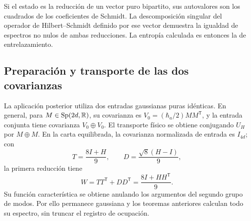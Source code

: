 Si el estado es la reducción de un vector puro bipartito, sus
autovalores son los cuadrados de los coeficientes de Schmidt.
La descomposición singular del operador de Hilbert--Schmidt definido
por ese vector demuestra la igualdad de espectros no nulos de ambas
reducciones. La entropía calculada es entonces la de entrelazamiento.

\subsection{Preparación y transporte de las dos covarianzas}
La aplicación posterior utiliza dos entradas gaussianas puras idénticas.
En general, para \(M\in\operatorname{Sp}(2d,\mathbb R)\), su covarianza es
\(V_0=(\hbar_a/2)MM^{\mathsf T}\), y la entrada conjunta tiene
covarianza \(V_0\oplus V_0\). El transporte físico se obtiene
conjugando \(U_H\) por \(M\oplus M\). En la carta equilibrada,
la covarianza normalizada de entrada es \(I_{4d}\); con
\[
 T=\frac{8I+H}{9},\qquad D=\frac{\sqrt8(H-I)}9,
\]
la primera reducción tiene
\[
 W=TT^{\mathsf T}+DD^{\mathsf T}=\frac{8I+HH^{\mathsf T}}9.
\]
Su función característica se obtiene anulando los argumentos del
segundo grupo de modos. Por ello permanece gaussiana y los teoremas
anteriores calculan todo su espectro, sin truncar el registro de ocupación.
